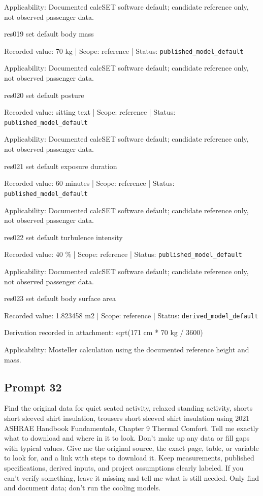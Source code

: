 Applicability: Documented calcSET software default; candidate reference only, not observed passenger data.

res019  set default body mass

Recorded value: 70 kg | Scope: reference | Status: \nolinkurl{published_model_default}

Applicability: Documented calcSET software default; candidate reference only, not observed passenger data.

res020  set default posture

Recorded value: sitting text | Scope: reference | Status: \nolinkurl{published_model_default}

Applicability: Documented calcSET software default; candidate reference only, not observed passenger data.

res021  set default exposure duration

Recorded value: 60 minutes | Scope: reference | Status: \nolinkurl{published_model_default}

Applicability: Documented calcSET software default; candidate reference only, not observed passenger data.

res022  set default turbulence intensity

Recorded value: 40 \% | Scope: reference | Status: \nolinkurl{published_model_default}

Applicability: Documented calcSET software default; candidate reference only, not observed passenger data.

res023  set default body surface area

Recorded value: 1.823458 m2 | Scope: reference | Status: \nolinkurl{derived_model_default}

Derivation recorded in attachment: sqrt(171 cm * 70 kg / 3600)

Applicability: Mosteller calculation using the documented reference height and mass.

\subsection*{Prompt 32}
Find the original data for quiet seated activity, relaxed standing activity, shorts short sleeved shirt insulation, trousers short sleeved shirt insulation using 2021 ASHRAE Handbook Fundamentals, Chapter 9 Thermal Comfort. Tell me exactly what to download and where in it to look. Don’t make up any data or fill gaps with typical values. Give me the original source, the exact page, table, or variable to look for, and a link with steps to download it. Keep measurements, published specifications, derived inputs, and project assumptions clearly labeled. If you can’t verify something, leave it missing and tell me what is still needed. Only find and document data; don’t run the cooling models.

